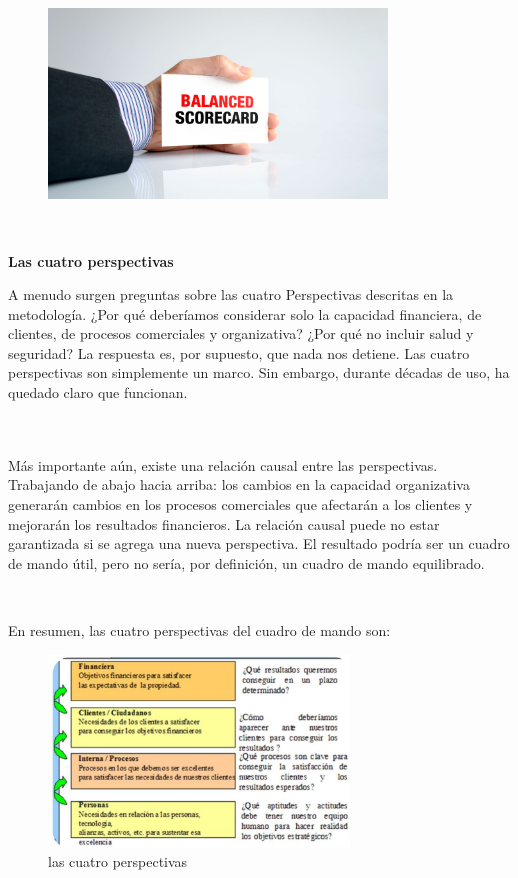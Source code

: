 \documentclass[a4paper,12pt,twocolumn]{article}
\begin{document}
\begin{figure}[h!]
\centering
\includegraphics[width=9cm]{./Imagenes/img3}
\end{figure}
\\
\item \textbf{Las cuatro perspectivas}
\item{A menudo surgen preguntas sobre las cuatro Perspectivas descritas en la metodología. ¿Por qué deberíamos considerar solo la capacidad financiera, de clientes, de procesos comerciales y organizativa? ¿Por qué no incluir salud y seguridad? La respuesta es, por supuesto, que nada nos detiene. Las cuatro perspectivas son simplemente un marco. Sin embargo, durante décadas de uso, ha quedado claro que funcionan.

\\
\textbf{}
\\
Más importante aún, existe una relación causal entre las perspectivas. Trabajando de abajo hacia arriba: los cambios en la capacidad organizativa generarán cambios en los procesos comerciales que afectarán a los clientes y mejorarán los resultados financieros. La relación causal puede no estar garantizada si se agrega una nueva perspectiva. El resultado podría ser un cuadro de mando útil, pero no sería, por definición, un cuadro de mando equilibrado.}
\\
\item{En resumen, las cuatro perspectivas del cuadro de mando son:}
\textbf{}

\begin{figure}[h!]
\centering
\includegraphics[width=8cm]{./Imagenes/img13}
\caption{\label{fig:01}las cuatro perspectivas}
\end{figure}
\end{document}
